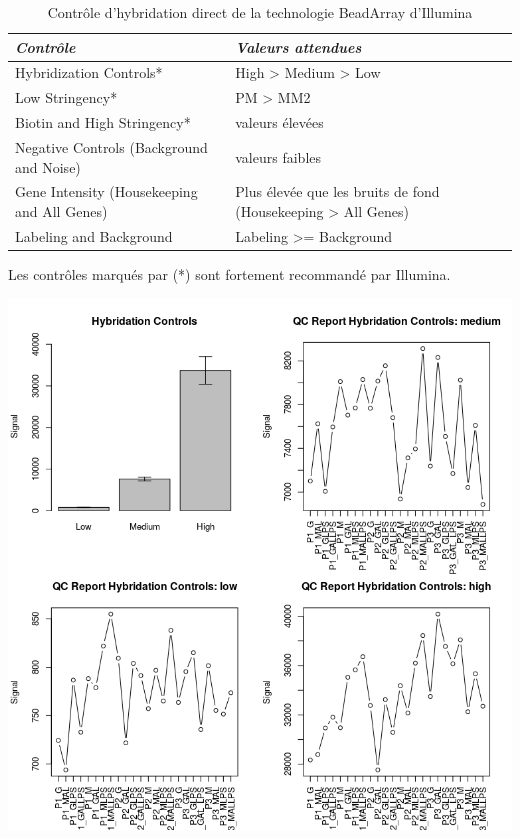 \documentclass[a4paper,10pt]{article}
\begin{document}
\begin{table}[!ht]
\centering
\begin{tabular}{|p{3cm}|p{9cm}|}
\hline
 \emph{Contrôle} & \emph{Valeurs attendues}\\
\hline
Hybridization Controls*   &  High > Medium > Low \\
\hline 
Low Stringency* & PM > MM2\\
\hline
Biotin and High Stringency* & valeurs élevées\\
\hline
Negative Controls (Background and Noise) & valeurs faibles \\
\hline
Gene Intensity (Housekeeping and All Genes) & Plus élevée que les bruits de fond (Housekeeping > All Genes) \\
\hline
Labeling and Background & Labeling >= Background \\
\hline
\end{tabular}
\caption{Contrôle d'hybridation direct de la technologie BeadArray d'Illumina}
\label{Control Dyrect  Hyb}
Les contrôles marqués par (*) sont fortement recommandé par Illumina.
\end{table}
\begin{center}
 \includegraphics[scale=0.5]{../../R/output/hybControl.png}
\end{center}
\end{document}

